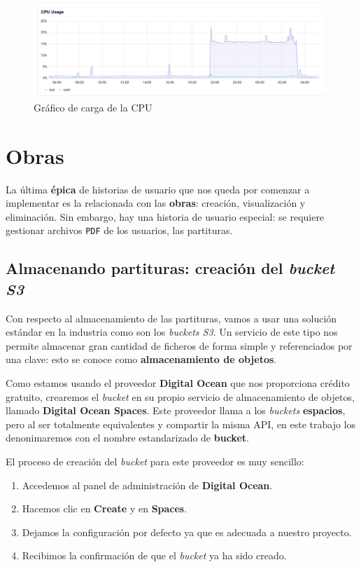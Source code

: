 \begin{figure}[h]
\centering
\includegraphics[width=\textwidth]{imagenes/implementacion/carga_cpu_docker_health_check.png}
\caption{Gráfico de carga de la CPU}
\label{fig:usoCPUProd}
\end{figure}

\section{Obras}

La última \textbf{épica} de historias de usuario que nos queda por comenzar a implementar es la relacionada con las \textbf{obras}: creación, visualización y eliminación. Sin embargo, hay una historia de usuario especial: se requiere gestionar archivos \texttt{PDF} de los usuarios, las partituras.


\subsection{Almacenando partituras: creación del \textit{bucket S3}}\label{subsection:crearBucket}

Con respecto al almacenamiento de las partituras, vamos a usar una solución estándar en la industria como son los \textit{buckets S3}. Un servicio de este tipo nos permite almacenar gran cantidad de ficheros de forma simple y referenciados por una clave: esto se conoce como \textbf{almacenamiento de objetos}. 

Como estamos usando el proveedor \textbf{Digital Ocean} que nos proporciona crédito gratuito, crearemos el \textit{bucket} en su propio servicio de almacenamiento de objetos, llamado \textbf{Digital Ocean Spaces}. Este proveedor llama a los \textit{buckets} \textbf{espacios}, pero al ser totalmente equivalentes y compartir la misma API, en este trabajo los denonimaremos con el nombre estandarizado de \textbf{bucket}.

El proceso de creación del \textit{bucket} para este proveedor es muy sencillo:

\begin{enumerate}
    \item Accedemos al panel de administración de \textbf{Digital Ocean}.
    \item Hacemos clic en \textbf{Create} y en \textbf{Spaces}.
    \item Dejamos la configuración por defecto ya que es adecuada a nuestro proyecto.
    \item Recibimos la confirmación de que el \textit{bucket} ya ha sido creado.
\end{enumerate}


